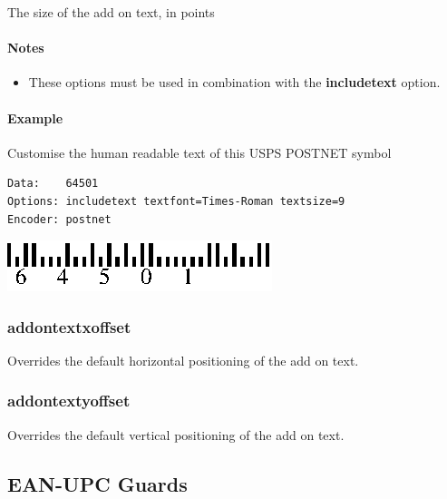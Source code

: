 The size of the add on text, in points

\hypertarget{notes-7}{%
\paragraph{Notes}\label{notes-7}}

\begin{itemize}
\tightlist
\item
  These options must be used in combination with the
  \textbf{includetext} option.
\end{itemize}

\hypertarget{example-36}{%
\paragraph{Example}\label{example-36}}

Customise the human readable text of this USPS POSTNET symbol

\begin{verbatim}
Data:    64501
Options: includetext textfont=Times-Roman textsize=9
Encoder: postnet
\end{verbatim}

\includegraphics{images/opttextfont.eps}

\hypertarget{addontextxoffset}{%
\subsubsection{addontextxoffset}\label{addontextxoffset}}

Overrides the default horizontal positioning of the add on text.

\hypertarget{addontextyoffset}{%
\subsubsection{addontextyoffset}\label{addontextyoffset}}

Overrides the default vertical positioning of the add on text.

\hypertarget{ean-upc-guards}{%
\subsection{EAN-UPC Guards}\label{ean-upc-guards}}

